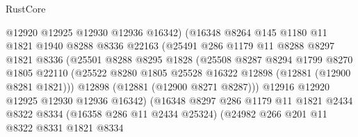 \begin{lexlean}{RustCore}
\begin{coremodule}
                            @12920
                            @12925
                            @12930
                            @12936
                            @16342)
                          (@16348
                            @8264
                            @145
                            @1180
                            @11
                            @1821
                            @1940
                            @8288
                            @8336
                            @22163
                            (@25491
                              @286
                              @1179
                              @11
                              @8288
                              @8297
                              @1821
                              @8336
                              (@25501
                                @8288
                                @8295
                                @1828
                                (@25508
                                  @8287
                                  @8294
                                  @1799
                                  @8270
                                  @1805
                                  @22110
                                  (@25522
                                    @8280
                                    @1805
                                    @25528
                                    @16322
                                    @12898
                                    (@12881 (@12900 @8281 @1821)))
                                  @12898
                                  (@12881 (@12900 @8271 @8287)))
                                @12916
                                @12920
                                @12925
                                @12930
                                @12936
                                @16342)
                              (@16348
                                @8297
                                @286
                                @1179
                                @11
                                @1821
                                @2434
                                @8322
                                @8334
                                (@16358 @286 @11 @2434 @25324)
                                (@24982
                                  @266
                                  @201
                                  @11
                                  @8322
                                  @8331
                                  @1821
                                  @8334

\end{coremodule}
\end{lexlean}
